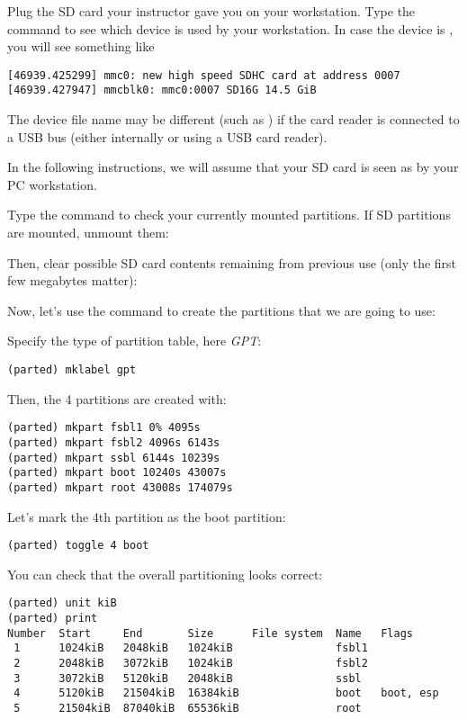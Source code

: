 Plug the SD card your instructor gave you on your workstation. Type
the  command to see which device is used by your
workstation. In case the device is , you will see
something like

\begin{verbatim}
[46939.425299] mmc0: new high speed SDHC card at address 0007
[46939.427947] mmcblk0: mmc0:0007 SD16G 14.5 GiB
\end{verbatim}

The device file name may be different (such as )
if the card reader is connected to a USB bus (either internally
or using a USB card reader).

In the following instructions, we will assume that your SD card is
seen as  by your PC workstation.

Type the  command to check your currently mounted
partitions. If SD partitions are mounted, unmount them:


Then, clear possible SD card contents remaining from previous use
(only the first few megabytes matter):


Now, let's use the  command to create the partitions that
we are going to use:


Specify the type of partition table, here {\em GPT}:

\begin{verbatim}
(parted) mklabel gpt
\end{verbatim}

Then, the 4 partitions are created with:
\begin{verbatim}
(parted) mkpart fsbl1 0% 4095s
(parted) mkpart fsbl2 4096s 6143s
(parted) mkpart ssbl 6144s 10239s
(parted) mkpart boot 10240s 43007s
(parted) mkpart root 43008s 174079s
\end{verbatim}

Let's mark the 4th partition as the boot partition:

\begin{verbatim}
(parted) toggle 4 boot
\end{verbatim}

You can check that the overall partitioning looks correct:

\begin{verbatim}
(parted) unit kiB
(parted) print
Number  Start     End       Size      File system  Name   Flags
 1      1024kiB   2048kiB   1024kiB                fsbl1
 2      2048kiB   3072kiB   1024kiB                fsbl2
 3      3072kiB   5120kiB   2048kiB                ssbl
 4      5120kiB   21504kiB  16384kiB               boot   boot, esp
 5      21504kiB  87040kiB  65536kiB               root
\end{verbatim}

